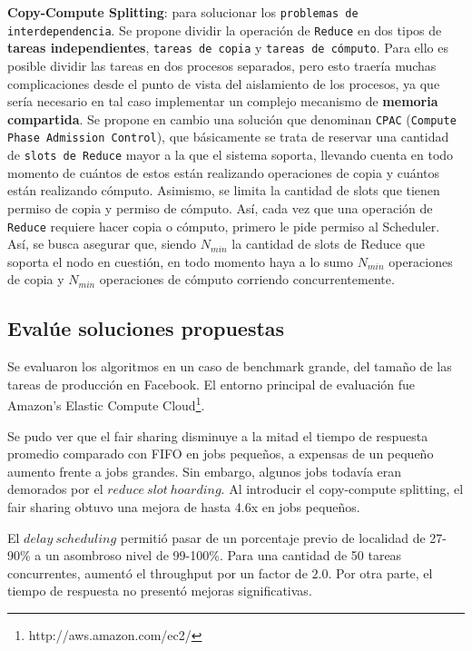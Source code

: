 \documentclass[11pt, a4paper, twoside]{article}
\begin{document}
\textbf{Copy-Compute Splitting}: para solucionar los \texttt{problemas de
interdependencia}. Se propone dividir la operación de \texttt{Reduce} en dos
tipos de \textbf{tareas independientes}, \texttt{tareas de copia} y
\texttt{tareas de cómputo}. Para ello es posible dividir las tareas en dos
procesos separados, pero esto traería muchas complicaciones desde el punto de
vista del aislamiento de los procesos, ya que sería necesario en tal caso
implementar un complejo mecanismo de \textbf{memoria compartida}. Se propone en
cambio una solución que denominan \texttt{CPAC} (\texttt{Compute Phase Admission
Control}), que básicamente se trata de reservar una cantidad de \texttt{slots de
Reduce} mayor a la que el sistema soporta, llevando cuenta en todo momento de
cuántos de estos están realizando operaciones de copia y cuántos están
realizando cómputo. Asimismo, se limita la cantidad de slots que tienen permiso
de copia y permiso de cómputo. Así, cada vez que una operación de
\texttt{Reduce} requiere hacer copia o cómputo, primero le pide permiso al
Scheduler. Así, se busca asegurar que, siendo $N_{min}$ la cantidad de slots de
Reduce que soporta el nodo en cuestión, en todo momento haya a lo sumo $N_{min}$
operaciones de copia y $N_{min}$ operaciones de cómputo corriendo
concurrentemente.

\clearpage
\subsection {\footnotesize Evalúe soluciones propuestas}
\label{investigacion-7}

Se evaluaron los algoritmos en un caso de benchmark grande, del tamaño de las tareas de producción en Facebook. El entorno principal de evaluación fue Amazon's Elastic Compute Cloud\footnote{http://aws.amazon.com/ec2/}.

Se pudo ver que el fair sharing disminuye a la mitad el tiempo de respuesta promedio comparado con FIFO en jobs pequeños, a expensas de un pequeño aumento frente a jobs grandes. Sin embargo, algunos jobs todavía eran demorados por el $reduce\ slot\ hoarding$. Al introducir el copy-compute splitting, el fair sharing obtuvo una mejora de hasta 4.6x en jobs pequeños.

El $delay\ scheduling$ permitió pasar de un porcentaje previo de localidad de 27-90\% a un asombroso nivel de 99-100\%. Para una cantidad de 50 tareas concurrentes, aumentó el throughput por un factor de $2.0$. Por otra parte, el tiempo de respuesta no presentó mejoras significativas.
\end{document}
